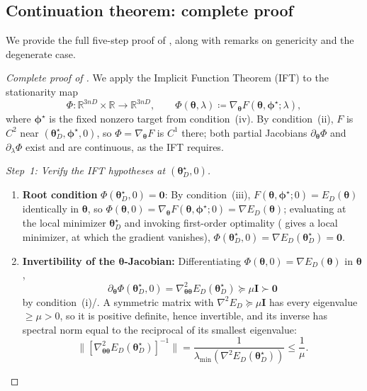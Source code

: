 \documentclass[11pt]{article}
\newcommand{\bbR}{\mathbb{R}}
\theoremstyle{plain}
\theoremstyle{plain}
\begin{document}
\subsection{Continuation theorem: complete proof}
\label{app:continuation_complete}
We provide the full five-step proof of , along
with remarks on genericity and the degenerate case.
\begin{proof}[Complete proof of ]
We apply the Implicit Function Theorem (IFT) to the stationarity map
\begin{equation}\label{eq:Phi_def_app}
  \Phi:\bbR^{3nD}\times\bbR\to\bbR^{3nD},
  \qquad
  \Phi(\bm\theta,\lambda)
  \coloneqq\nabla_{\bm\theta}F(\bm\theta,\bm\phi^\star;\lambda),
\end{equation}
where $\bm\phi^\star$ is the fixed nonzero target from condition~(iv).
By condition~(ii), $F$ is $C^2$ near
$(\bm\theta_D^\star,\bm\phi^\star,0)$, so $\Phi=\nabla_{\bm\theta}F$ is
$C^1$ there; both partial Jacobians $\partial_{\bm\theta}\Phi$ and
$\partial_\lambda\Phi$ exist and are continuous, as the IFT requires.

\emph{Step~1: Verify the IFT hypotheses at $(\bm\theta_D^\star,0)$.}
\begin{enumerate}[label=(\alph*)]
  \item \textbf{Root condition} $\Phi(\bm\theta_D^\star,0)=\bm 0$:
    By condition~(iii), $F(\bm\theta,\bm\phi^\star;0)=E_D(\bm\theta)$
    identically in $\bm\theta$, so
    $\Phi(\bm\theta,0)=\nabla_{\bm\theta}F(\bm\theta,\bm\phi^\star;0)
    =\nabla E_D(\bm\theta)$; evaluating at the local minimizer
    $\bm\theta_D^\star$ and invoking first-order optimality
    ( gives a local minimizer, at which the
    gradient vanishes),
    $\Phi(\bm\theta_D^\star,0)=\nabla E_D(\bm\theta_D^\star)=\bm 0$.
  \item \textbf{Invertibility of the $\bm\theta$-Jacobian:}
    Differentiating $\Phi(\bm\theta,0)=\nabla E_D(\bm\theta)$ in
    $\bm\theta$,
    \begin{equation}\label{eq:Phi_theta_jac}
      \partial_{\bm\theta}\Phi(\bm\theta_D^\star,0)
      =\nabla^2_{\bm\theta\bm\theta}E_D(\bm\theta_D^\star)
      \succeq\mu\mathbf{I}\succ\mathbf 0
    \end{equation}
    by condition~(i)/.  A symmetric matrix with
    $\nabla^2 E_D\succeq\mu\mathbf{I}$ has every eigenvalue $\ge\mu>0$, so
    it is positive definite, hence invertible, and its inverse has
    spectral norm equal to the reciprocal of its smallest eigenvalue:
    \begin{equation}\label{eq:hess_inv_bound}
      \bigl\|[\nabla^2_{\bm\theta\bm\theta}E_D(\bm\theta_D^\star)]^{-1}\bigr\|
      =\frac{1}{\lambda_{\min}(\nabla^2 E_D(\bm\theta_D^\star))}
      \le\frac{1}{\mu}.
    \end{equation}
\end{enumerate}


\end{proof}
\end{document}
